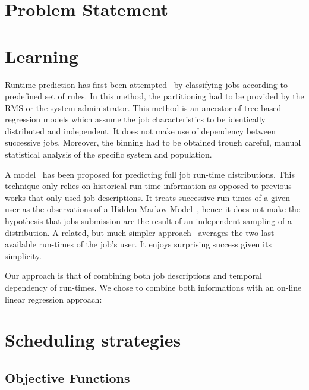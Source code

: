 \documentclass{llncs}
\begin{document}
\section{Problem Statement}
\label{sec:problem_statement}





\section{Learning}
\label{sec:learning}
Runtime prediction has first been attempted~\cite{gibbons} by classifying jobs according to predefined set of rules. In this method, the partitioning had to be provided by the RMS or the system administrator. This method is an ancestor of tree-based regression models which assume the job characteristics to be identically distributed and independent. It does not make use of dependency between successive jobs. Moreover, the binning had to be obtained trough careful, manual statistical analysis of the specific system and population.

A model~\cite{hmm} has been proposed for predicting full job run-time distributions. This technique only relies on historical run-time information as opposed to previous works that only used job descriptions. It treats successive run-times of a given user as the observations of a Hidden Markov Model~\cite{rabiner}, hence it does not make the hypothesis that jobs submission are the result of an independent sampling of a distribution.
A related, but much simpler approach~\cite{tsafir} averages the two last available run-times of the job's user. It enjoys surprising success given its simplicity.

Our approach is that of combining both job descriptions and temporal dependency of run-times. We chose to combine both informations with an on-line linear regression approach:





\section{Scheduling strategies}
\label{sec:scheduling_strategies}

\subsection{Objective Functions}
\label{sub:objective_functions}
\end{document}
